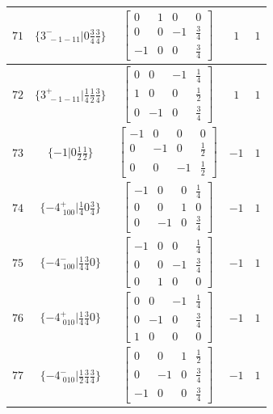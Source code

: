 \documentclass[fleqn,8pt]{jsarticle}
\begin{document}
\begin{longtable}{ccccc}
$ 71 $ & $ \{3^{-}_{\,\,-1-11}|0 \frac{3}{4} \frac{3}{4}\} $ & $ \begin{bmatrix} 0 & 1 & 0 & 0 \\ 0 & 0 & -1 & \frac{3}{4} \\ -1 & 0 & 0 & \frac{3}{4} \end{bmatrix} $ & $ 1 $ & $ 1 $ \\ \hline
$ 72 $ & $ \{3^{+}_{\,\,-1-11}|\frac{1}{4} \frac{1}{2} \frac{3}{4}\} $ & $ \begin{bmatrix} 0 & 0 & -1 & \frac{1}{4} \\ 1 & 0 & 0 & \frac{1}{2} \\ 0 & -1 & 0 & \frac{3}{4} \end{bmatrix} $ & $ 1 $ & $ 1 $ \\ \hline
$ 73 $ & $ \{-1|0 \frac{1}{2} \frac{1}{2}\} $ & $ \begin{bmatrix} -1 & 0 & 0 & 0 \\ 0 & -1 & 0 & \frac{1}{2} \\ 0 & 0 & -1 & \frac{1}{2} \end{bmatrix} $ & $ -1 $ & $ 1 $ \\ \hline
$ 74 $ & $ \{-4^{+}_{\,\,100}|\frac{1}{4} 0 \frac{3}{4}\} $ & $ \begin{bmatrix} -1 & 0 & 0 & \frac{1}{4} \\ 0 & 0 & 1 & 0 \\ 0 & -1 & 0 & \frac{3}{4} \end{bmatrix} $ & $ -1 $ & $ 1 $ \\ \hline
$ 75 $ & $ \{-4^{-}_{\,\,100}|\frac{1}{4} \frac{3}{4} 0\} $ & $ \begin{bmatrix} -1 & 0 & 0 & \frac{1}{4} \\ 0 & 0 & -1 & \frac{3}{4} \\ 0 & 1 & 0 & 0 \end{bmatrix} $ & $ -1 $ & $ 1 $ \\ \hline
$ 76 $ & $ \{-4^{+}_{\,\,010}|\frac{1}{4} \frac{3}{4} 0\} $ & $ \begin{bmatrix} 0 & 0 & -1 & \frac{1}{4} \\ 0 & -1 & 0 & \frac{3}{4} \\ 1 & 0 & 0 & 0 \end{bmatrix} $ & $ -1 $ & $ 1 $ \\ \hline
$ 77 $ & $ \{-4^{-}_{\,\,010}|\frac{1}{2} \frac{3}{4} \frac{3}{4}\} $ & $ \begin{bmatrix} 0 & 0 & 1 & \frac{1}{2} \\ 0 & -1 & 0 & \frac{3}{4} \\ -1 & 0 & 0 & \frac{3}{4} \end{bmatrix} $ & $ -1 $ & $ 1 $ \\ \hline

\end{longtable}
\end{document}
